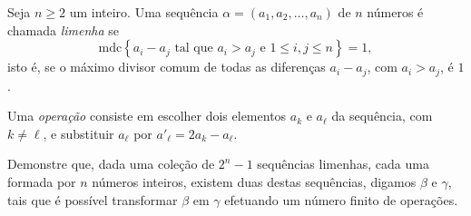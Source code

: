 Seja $n \ge 2$ um inteiro. Uma sequência $\alpha = (a_1, a_2, \dots, a_n)$ de $n$ números é chamada \emph{limenha} se
\[\mathrm{mdc}\left\{ a_i - a_j \text{\ tal que\ } a_i > a_j \text{\ e\ } 1 \le i, j \le n\right\} = 1,\]
isto é, se o máximo divisor comum de todas as diferenças $a_i - a_j$, com $a_i > a_j$, é $1$.

Uma \emph{operação} consiste em escolher dois elementos $a_k$ e $a_\ell$ da sequência, com $k \neq \ell$, e substituir $a_\ell$ por $a'_\ell = 2a_k - a_\ell$.

Demonstre que, dada uma coleção de $2^n - 1$ sequências limenhas, cada uma formada por $n$ números inteiros, existem duas destas sequências, digamos $\beta$ e $\gamma$, tais que é possível transformar $\beta$ em $\gamma$ efetuando um número finito de operações.
